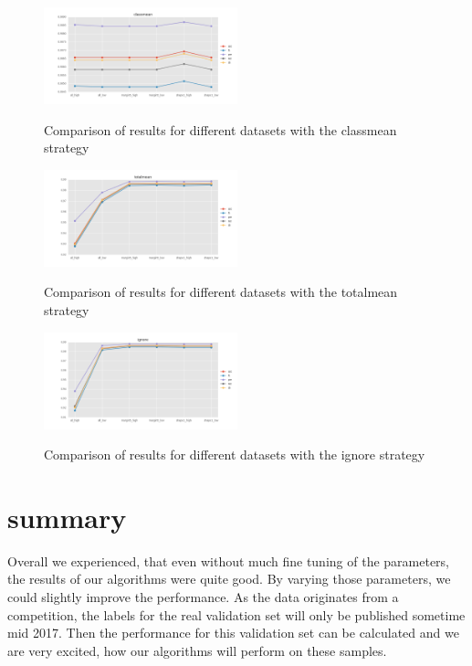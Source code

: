 \documentclass{sig-alternate-05-2015}
\begin{document}
\begin{figure}[h]
  \centering
  \caption{Comparison of results for different datasets with the classmean strategy}
  \includegraphics[width=0.5\textwidth]{../plots/classmean_missing_values}
  \label{fig:classmean_mval}
\end{figure}

\begin{figure}[h]
  \centering
  \caption{Comparison of results for different datasets with the totalmean strategy}
  \includegraphics[width=0.5\textwidth]{../plots/totalmean_missing_values}
  \label{fig:totalmean_mval}
\end{figure}

\begin{figure}[h]
  \centering
  \caption{Comparison of results for different datasets with the ignore strategy}
  \includegraphics[width=0.5\textwidth]{../plots/ignore_missing_values}
  \label{fig:ignore_mval}
\end{figure}

\section{summary}

Overall we experienced, that even without much fine tuning of the parameters, the results of our algorithms were quite good.
By varying those parameters, we could slightly improve the performance.
As the data originates from a competition, the labels for the real validation set will only be published sometime mid 2017.
Then the performance for this validation set can be calculated and we are very excited, how our algorithms will perform on these samples.


\end{document}
